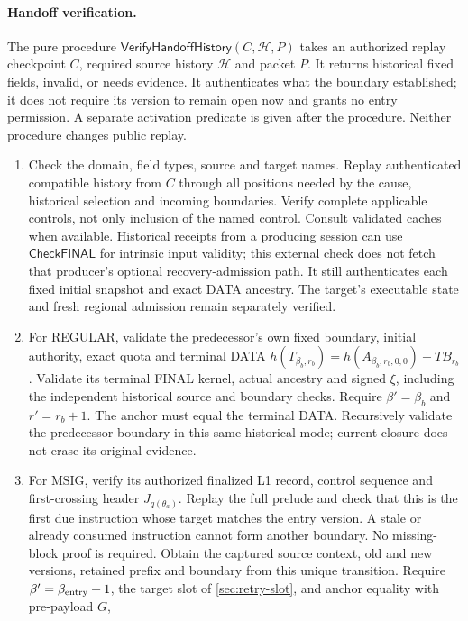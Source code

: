 \documentclass[11pt,a4paper]{article}
\newcommand{\TB}{\mathit{TB}}
\newcommand{\tagg}[1]{\ensuremath{\mathsf{#1}}}
\begin{document}
\paragraph{Handoff verification.}
\label{sec:verify-handoff}
The pure procedure $\tagg{VerifyHandoffHistory}(C,\mathcal H,P)$ takes an
authorized replay checkpoint $C$, required source history $\mathcal H$
and packet $P$. It returns historical fixed fields, invalid, or needs
evidence. It authenticates what the boundary established; it does not
require its version to remain open now and grants no entry permission.
A separate activation predicate is given after the procedure. Neither
procedure changes public replay.
\begin{enumerate}[label=(\roman*),itemsep=2pt]
\item Check the domain, field types, source and target names. Replay
authenticated compatible history from $C$ through all positions
needed by the cause, historical selection and incoming boundaries.
Verify complete applicable controls, not only inclusion of the named
control. Consult validated caches when available. Historical receipts
from a producing session can use \tagg{CheckFINAL} for intrinsic input
validity; this external check does not fetch that producer's optional
recovery-admission path. It still authenticates each fixed initial
snapshot and exact DATA ancestry. The target's executable state and
fresh regional admission remain separately verified.
\item For REGULAR, validate the predecessor's own fixed boundary,
initial authority, exact quota and terminal DATA
$h(T_{\beta_b,r_b})=h(A_{\beta_b,r_b,0,0})+\TB_{r_b}$.
Validate its terminal FINAL kernel, actual ancestry and signed $\xi$,
including the independent historical source and boundary checks.
Require $\beta'=\beta_b$ and $r'=r_b+1$. The anchor must equal the
terminal DATA. Recursively validate the predecessor boundary in this same
historical mode; current closure does not erase its original evidence.
\item For MSIG, verify its authorized finalized L1 record, control
sequence and first-crossing header $J_{q(\theta_a)}$. Replay the full
prelude and check that this is the first due instruction whose target
matches the entry version. A stale or already consumed instruction
cannot form another boundary. No missing-block proof is required.
Obtain the captured source context, old and new versions, retained
prefix and boundary from this unique transition.
Require $\beta'=\beta_{\rm entry}+1$, the target slot of
\cref{sec:retry-slot}, and anchor equality with pre-payload $G$,

\end{enumerate}
\end{document}
